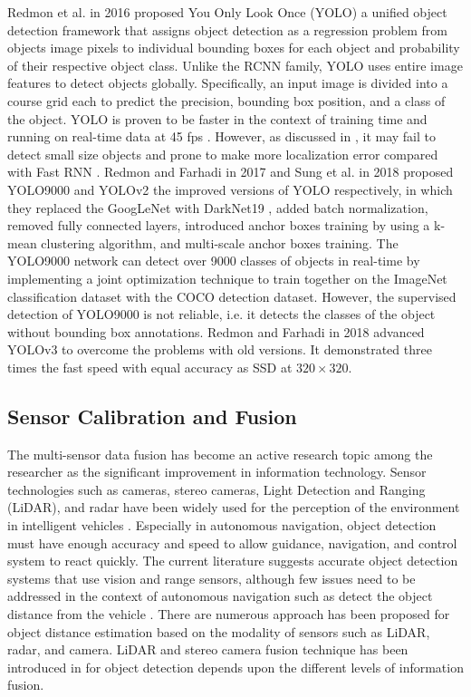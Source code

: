 Redmon et al. \cite{redmon2016} in 2016 proposed You Only Look Once (YOLO) a unified object detection framework that assigns object detection as a regression problem from objects image pixels to individual bounding boxes for each object and probability of their respective object class. Unlike the RCNN family, YOLO uses entire image features to detect objects globally. Specifically, an input image is divided into a course grid each to predict the precision, bounding box position, and a class of the object. YOLO is proven to be faster in the context of training time and running on real-time data at 45 fps \cite{redmon2016}. However, as discussed in \cite{redmon2016}, it may fail to detect small size objects and prone to make more localization error compared with Fast RNN \cite{7410526}. Redmon and Farhadi in 2017 and Sung et al. in 2018 proposed YOLO9000 \cite{YOLO9000} and YOLOv2 \cite{yolov2} the improved versions of YOLO respectively, in which they replaced the GoogLeNet \cite{googlenet} with DarkNet19 \cite{YOLO9000}, added batch normalization, removed fully connected layers, introduced anchor boxes training by using a k-mean clustering algorithm, and multi-scale anchor boxes training. The YOLO9000 network can detect over 9000 classes of objects in real-time by implementing a joint optimization technique to train together on the ImageNet classification dataset with the COCO detection dataset. However, the supervised detection of YOLO9000 is not reliable, i.e. it detects the classes of the object without bounding box annotations. Redmon and Farhadi \cite{yolov3} in 2018 advanced YOLOv3 to overcome the problems with old versions. It demonstrated three times the fast speed with equal accuracy as SSD at $320 \times 320$.


\subsection{Sensor Calibration and Fusion}
The multi-sensor data fusion has become an active research topic among the researcher as the significant improvement in information technology. Sensor technologies such as cameras, stereo cameras, Light Detection and Ranging (LiDAR), and radar have been widely used for the perception of the environment in intelligent vehicles \cite{van2018}. Especially in autonomous navigation, object detection must have enough accuracy and speed to allow guidance, navigation, and control system to react quickly. The current literature suggests accurate object detection systems that use vision and range sensors, although few issues need to be addressed in the context of autonomous navigation such as detect the object distance from the vehicle \cite{sym12020324}. There are numerous approach has been proposed for object distance estimation based on the modality of sensors such as LiDAR, radar, and camera. LiDAR and stereo camera fusion technique has been introduced in \cite{sym12020324} for object detection depends upon the different levels of information fusion.           

